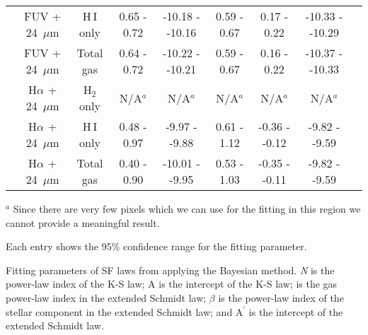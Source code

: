 \begin{table*}
\begin{tabular}{ccccccccc}
 & FUV + 24~$\mu$m       & H\,{\sc I} only    & 0.65 - 0.72 & -10.18 - -10.16  & 0.59 - 0.67    & 0.17 - 0.22    & -10.33 - -10.29     \\
 & FUV + 24~$\mu$m       & Total gas  & 0.64 - 0.72 & -10.22 - -10.21  &  0.59 - 0.67   & 0.16 - 0.22    & -10.37 - -10.33     \\
 & H$\alpha$ + 24~$\mu$m & H$_2$ only &  N/A$^a$ & N/A$^a$ & N/A$^a$ &N/A$^a$ & N/A$^a$     \\
 & H$\alpha$ + 24~$\mu$m & H\,{\sc I} only    & 0.48 - 0.97 &  -9.97 - -9.88  & 0.61 - 1.12    & -0.36 - -0.12    & -9.82 - -9.59     \\
 & H$\alpha$ + 24~$\mu$m & Total gas  & 0.40 - 0.90 & -10.01 - -9.95  &  0.53 - 1.03    & -0.35 - -0.11    & -9.82 - -9.59     \\
 \hline
\end{tabular}
\begin{tablenotes}
 \item $^a$  Since there are very few pixels which we can use for the fitting in this region we cannot provide a meaningful result.
\item Each entry shows the 95\% confidence range for the fitting parameter.
\item Fitting parameters of SF laws from applying the Bayesian method.  {\it N} is the power-law index of the K-S law; A is the intercept of the K-S law; \nprime is the gas power-law index in the extended Schmidt law;
 $\beta$ is the power-law index of the stellar component in the extended Schmidt law; and A$^\prime$ is the intercept of the extended Schmidt law.
\end{tablenotes}
\end{table*}








